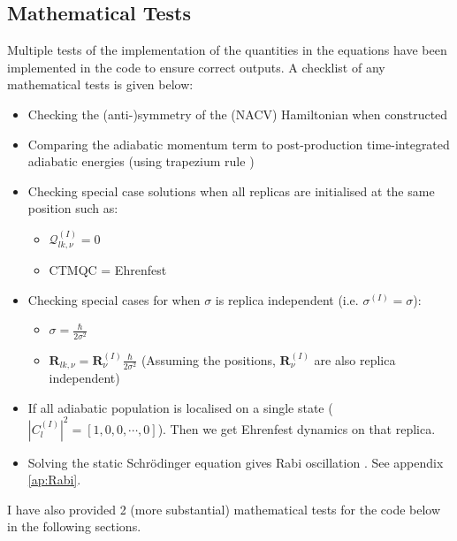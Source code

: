 \subsection{Mathematical Tests}
Multiple tests of the implementation of the quantities in the equations have been implemented in the code to ensure correct outputs. A checklist of any mathematical tests is given below:
\begin{itemize}
  \item Checking the (anti-)symmetry of the (NACV) Hamiltonian when constructed
  
  \item Comparing the adiabatic momentum term to post-production time-integrated adiabatic energies (using trapezium rule \cite{NumericalAnalysis})
  
  \item Checking special case solutions when all replicas are initialised at the same position such as:
	\begin{itemize}
	  \item $\mathcal{Q}_{lk, \nu}^{(I)} = 0$
	  \item CTMQC = Ehrenfest
	\end{itemize}

  \item Checking special cases for when $\sigma$ is replica independent (i.e. $\sigma^{(I)} = \sigma$):
	\begin{itemize}
	  \item $\sigma = \frac{\hbar}{2 \sigma^2}$
	  \item $\mathbf{R}_{lk, \nu} = \mathbf{R}_{\nu}^{(I)} \frac{\hbar}{2 \sigma^2}$ (Assuming the positions, $\mathbf{R}_{\nu}^{(I)}$ are also replica independent)
	\end{itemize}

  \item If all adiabatic population is localised on a single state ($|C_{l}^{(I)}|^2 = [1, 0, 0, \cdots, 0]$). Then we get Ehrenfest dynamics on that replica.
  \item Solving the static Schr\"odinger equation gives Rabi oscillation \cite{FeynmanLectVol3}. See appendix \ref{ap:Rabi}.
\end{itemize}

I have also provided 2 (more substantial) mathematical tests for the code below in the following sections.
